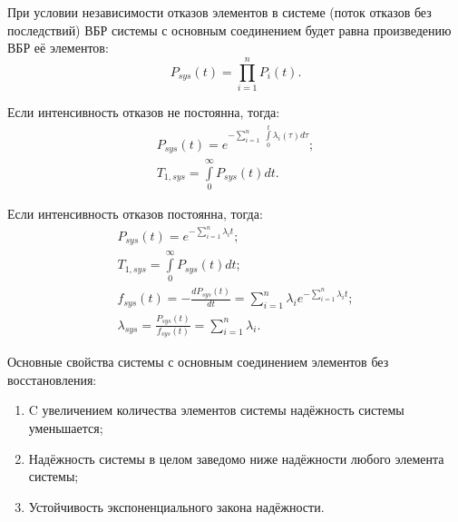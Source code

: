 	При условии независимости отказов элементов в системе (поток отказов без последствий) ВБР системы с основным соединением будет равна произведению ВБР её элементов:
	\begin{equation}
		P_{sys}(t) = \prod\limits_{i = 1}^{n}P_{i}(t).
	\end{equation}

	Если интенсивность отказов не постоянна, тогда:
	\begin{gather}
		P_{sys}(t) = e^{-\sum\limits_{i = 1}^{n}\;\int\limits_{0}^{t}\lambda_{i}(\tau)d\tau};\\
		T_{1,sys} = \int\limits_{0}^{\infty}P_{sys}(t)dt.
	\end{gather}

	Если интенсивность отказов постоянна, тогда:
	\begin{gather}
		P_{sys}(t) = e^{-\sum\limits_{i = 1}^{n}\lambda_{i}t};\\
		T_{1,sys} = \int\limits_{0}^{\infty}P_{sys}(t)dt;\\
		f_{sys}(t) = -\frac{d P_{sys}(t)}{d t} = \sum\limits_{i = 1}^{n}\lambda_{i}e^{-\sum\limits_{i = 1}^{n}\lambda_{i}t};\\
		\lambda_{sys} = \frac{P_{sys}(t)}{f_{sys}(t)} = \sum\limits_{i = 1}^{n}\lambda_{i}.
	\end{gather}

	Основные свойства системы с основным соединением элементов без восстановления: 
	\begin{enumerate}
		\item C увеличением количества элементов системы надёжность системы уменьшается; 
		\item Надёжность системы в целом заведомо ниже надёжности любого элемента системы;
		\item Устойчивость экспоненциального закона надёжности.
	\end{enumerate}

